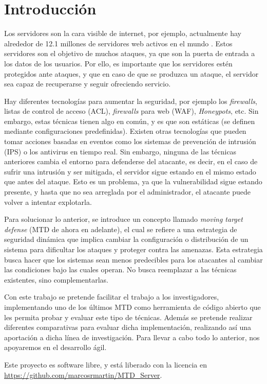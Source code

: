 \chapter{Introducción}

Los servidores son la cara visible de internet, por ejemplo, actualmente hay alrededor de 12.1 millones de servidores web activos en el mundo \cite{netcraft-agosto23}. Estos servidores son el objetivo de muchos ataques, ya que son la puerta de entrada a los datos de los usuarios.\cite{breaches-2023} Por ello, es importante que los servidores estén protegidos ante ataques, y que en caso de que se produzca un ataque, el servidor sea capaz de recuperarse y seguir ofreciendo servicio.

Hay diferentes tecnologías para aumentar la seguridad, por ejemplo los \textit{firewalls}, listas de control de acceso (ACL), \textit{firewalls} para web (WAF), \textit{Honeypots}, etc. Sin embargo, estas técnicas tienen algo en común, y es que son estáticas (se definen mediante configuraciones predefinidas). Existen otras tecnologías que pueden tomar acciones basadas en eventos como los sistemas de prevención de intrusión (IPS) o los antivirus en tiempo real. Sin embargo, ninguna de las técnicas anteriores cambia el entorno para defenderse del atacante, es decir, en el caso de sufrir una intrusión y ser mitigada, el servidor sigue estando en el mismo estado que antes del ataque. Esto es un problema, ya que la vulnerabilidad sigue estando presente, y hasta que no sea arreglada por el administrador, el atacante puede volver a intentar explotarla.
 
Para solucionar lo anterior, se introduce un concepto llamado \textit{moving target defense}\cite{big-state-of-art} (MTD de ahora en adelante), el cual se refiere a una estrategia de seguridad dinámica que implica cambiar la configuración o distribución de un sistema para dificultar los ataques y proteger contra las amenazas. Esta estrategia busca hacer que los sistemas sean menos predecibles para los atacantes al cambiar las condiciones bajo las cuales operan. No busca reemplazar a las técnicas existentes, sino complementarlas.

Con este trabajo se pretende facilitar el trabajo a los investigadores, implementando uno de los últimos MTD como herramienta de código abierto que les permita probar y evaluar este tipo de técnicas. Además se pretende realizar diferentes comparativas para evaluar dicha implementación, realizando así una aportación a dicha línea de investigación. Para llevar a cabo todo lo anterior, nos apoyaremos en el desarrollo ágil.

Este proyecto es software libre, y está liberado con la licencia\cite{gplv3} en \url{https://github.com/marcosrmartin/MTD_Server}.